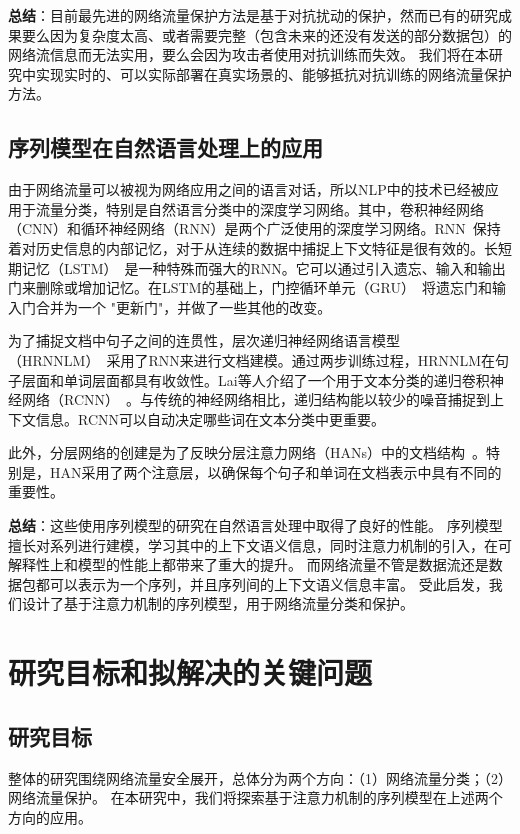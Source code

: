 \documentclass[degree=master,cjk-font=noto]{thuthesis}
\begin{document}
\textbf{总结}：目前最先进的网络流量保护方法是基于对抗扰动的保护，然而已有的研究成果要么因为复杂度太高、或者需要完整（包含未来的还没有发送的部分数据包）的网络流信息而无法实用，要么会因为攻击者使用对抗训练而失效。
我们将在本研究中实现实时的、可以实际部署在真实场景的、能够抵抗对抗训练的网络流量保护方法。

\section{序列模型在自然语言处理上的应用}

由于网络流量可以被视为网络应用之间的语言对话，所以NLP中的技术已经被应用于流量分类，特别是自然语言分类中的深度学习网络。其中，卷积神经网络（CNN）和循环神经网络（RNN）是两个广泛使用的深度学习网络。RNN~\cite{RNN}保持着对历史信息的内部记忆，对于从连续的数据中捕捉上下文特征是很有效的。长短期记忆（LSTM）~\cite{LSTM}是一种特殊而强大的RNN。它可以通过引入遗忘、输入和输出门来删除或增加记忆。在LSTM的基础上，门控循环单元（GRU）~\cite{GRU}将遗忘门和输入门合并为一个 "更新门"，并做了一些其他的改变。

为了捕捉文档中句子之间的连贯性，层次递归神经网络语言模型（HRNNLM）~\cite{b28}采用了RNN来进行文档建模。通过两步训练过程，HRNNLM在句子层面和单词层面都具有收敛性。Lai等人介绍了一个用于文本分类的递归卷积神经网络（RCNN）~\cite{b27}。与传统的神经网络相比，递归结构能以较少的噪音捕捉到上下文信息。RCNN可以自动决定哪些词在文本分类中更重要。

此外，分层网络的创建是为了反映分层注意力网络（HANs）中的文档结构~\cite{b29}。特别是，HAN采用了两个注意层，以确保每个句子和单词在文档表示中具有不同的重要性。

\textbf{总结}：这些使用序列模型的研究在自然语言处理中取得了良好的性能。
序列模型擅长对系列进行建模，学习其中的上下文语义信息，同时注意力机制的引入，在可解释性上和模型的性能上都带来了重大的提升。
而网络流量不管是数据流还是数据包都可以表示为一个序列，并且序列间的上下文语义信息丰富。
受此启发，我们设计了基于注意力机制的序列模型，用于网络流量分类和保护。

\chapter{研究目标和拟解决的关键问题}

\section{研究目标}

整体的研究围绕网络流量安全展开，总体分为两个方向：（1）网络流量分类；（2）网络流量保护。
在本研究中，我们将探索基于注意力机制的序列模型在上述两个方向的应用。
\end{document}
